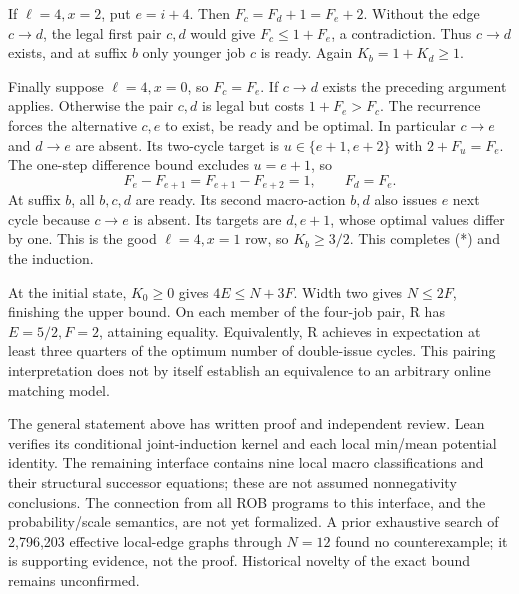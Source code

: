 \documentclass[11pt]{article}
\begin{document}
If $\ell=4,x=2$, put $e=i+4$. Then $F_c=F_d+1=F_e+2$. Without the edge
$c\to d$, the legal first pair $c,d$ would give $F_c\le1+F_e$, a
contradiction. Thus $c\to d$ exists, and at suffix $b$ only younger job
$c$ is ready. Again $K_b=1+K_d\ge1$.

Finally suppose $\ell=4,x=0$, so $F_c=F_e$. If $c\to d$ exists the
preceding argument applies. Otherwise the pair $c,d$ is legal but costs
$1+F_e>F_c$. The recurrence forces the alternative $c,e$ to exist, be
ready and be optimal. In particular $c\to e$ and $d\to e$ are absent.
Its two-cycle target is $u\in\{e+1,e+2\}$ with $2+F_u=F_e$.
The one-step difference bound excludes $u=e+1$, so
\[
 F_e-F_{e+1}=F_{e+1}-F_{e+2}=1,\qquad F_d=F_e.
\]
At suffix $b$, all $b,c,d$ are ready. Its second macro-action $b,d$
also issues $e$ next cycle because $c\to e$ is absent. Its targets are
$d,e+1$, whose optimal values differ by one. This is the good
$\ell=4,x=1$ row, so $K_b\ge3/2$. This completes (*) and the induction.

At the initial state, $K_0\ge0$ gives $4E\le N+3F$. Width two gives
$N\le2F$, finishing the upper bound. On each member of the four-job pair,
R has $E=5/2,F=2$, attaining equality. Equivalently, R achieves in
expectation at least three quarters of the optimum number of double-issue
cycles. This pairing interpretation does not by itself establish an
equivalence to an arbitrary online matching model.

The general statement above has written proof and independent review.
Lean verifies its conditional joint-induction kernel and each local
min/mean potential identity. The remaining interface contains nine local
macro classifications and their structural successor equations; these
are not assumed nonnegativity conclusions. The connection from all ROB
programs to this interface, and the probability/scale semantics, are not
yet formalized. A prior exhaustive search of 2,796,203 effective local-edge
graphs through $N=12$ found no counterexample; it is supporting evidence,
not the proof. Historical novelty of the exact bound remains unconfirmed.
\end{document}
